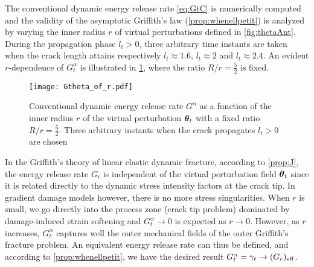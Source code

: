 The conventional dynamic energy release rate \eqref{eq:GtC} is numerically computed and the validity of the asymptotic Griffith's law (\cref{prop:whenellpetit}) is analyzed by varying the inner radius $r$ of virtual perturbations defined in \cref{fig:thetaAnt}. During the propagation phase $\dot{l}_t>0$, three arbitrary time instants are taken when the crack length attains respectively $l_t\approx 1.6$, $l_t\approx 2$ and $l_t\approx 2.4$. An evident $r$-dependence of $G^\alpha_t$ is illustrated in \cref{fig:indvelocity}, where the ratio $R/r=\frac{5}{2}$ is fixed.
\begin{figure}[htbp]
\centering
\texttt{[image: Gtheta\_of\_r.pdf]}
\caption{Conventional dynamic energy release rate $G^\alpha$ as a function of the inner radius $r$ of the virtual perturbation $\vtheta_t$ with a fixed ratio $R/r=\frac{5}{2}$. Three arbitrary instants when the crack propagates $\dot{l}_t>0$ are chosen} \label{fig:indvelocity}
\end{figure}
In the Griffith's theory of linear elastic dynamic fracture, according to \cref{prop:J}, the energy release rate $G_t$ is independent of the virtual perturbation field $\vtheta_t$ since it is related directly to the dynamic stress intensity factors at the crack tip. In gradient damage models however, there is no more stress singularities. When $r$ is small, we go directly into the process zone (crack tip problem) dominated by damage-induced strain softening and $G^\alpha_t\to 0$ is expected as $r\to 0$. However, as $r$ increases, $G^\alpha_t$ captures well the outer mechanical fields of the outer Griffith's fracture problem. An equivalent energy release rate can thus be defined, and according to \cref{prop:whenellpetit}, we have the desired result $G^\alpha_t=\gamma_t\to (G_\mathrm{c})_\mathrm{eff}$.

